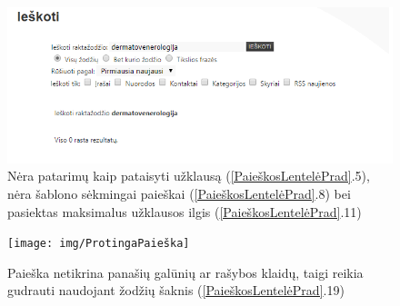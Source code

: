 \documentclass{VUMIFPSkursinis}
\begin{document}
\begin{figure}[H]
    \centering
    \includegraphics[scale=0.8]{img/TuščiaPaieška}
    \caption{Nėra patarimų kaip pataisyti užklausą (\ref{PaieškosLentelėPrad}.5), nėra šablono sėkmingai paieškai (\ref{PaieškosLentelėPrad}.8) bei pasiektas maksimalus užklausos ilgis (\ref{PaieškosLentelėPrad}.11)}
    \label{img:tuščiapaieška}
\end{figure}

\begin{figure}[H]
    \centering
    \texttt{[image: img/ProtingaPaieška]}
    \caption{Paieška netikrina panašių galūnių ar rašybos klaidų, taigi reikia gudrauti naudojant žodžių šaknis (\ref{PaieškosLentelėPrad}.19)}
    \label{img:protingapaieška}
\end{figure}

\pagebreak
\end{document}
